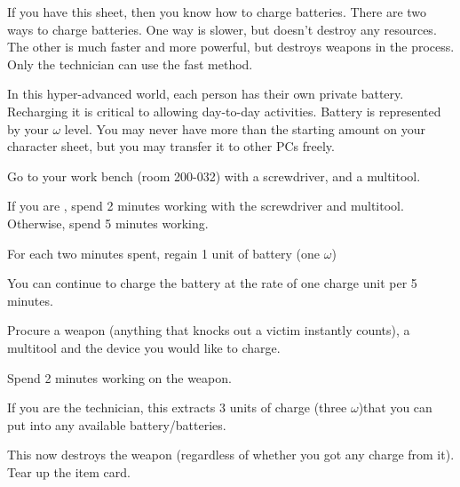 \documentclass[green]{guildcamp3}
\begin{document}
\name{\gBatterycharge{}}



If you have this sheet, then you know how to charge batteries. There are two ways to charge batteries. One way is slower, but doesn't destroy any resources. The other is much faster and more powerful, but destroys weapons in the process. Only the technician can use the fast method. 

In this hyper-advanced world, each person has their own private battery. Recharging it is critical to allowing day-to-day activities. Battery is represented by your $\omega$ level. You may never have more than the starting amount on your character sheet, but you may transfer it to other PCs freely.


\begin{enum}
  \item Go to your work bench (room 200-032) with a screwdriver, and a multitool.
  \item If you are \cTech{}, spend 2 minutes working with the screwdriver and multitool. Otherwise, spend 5 minutes working.
  \item For each two minutes spent, regain 1 unit of battery (one $\omega$)
  \item You can continue to charge the battery at the rate of one charge unit per 5 minutes. 
\end{enum}

\begin{enum}
	\item Procure a weapon (anything that knocks out a victim instantly counts), a multitool and the device you would like to charge.
	\item Spend 2 minutes working on the weapon. 
	\item If you are the technician, this extracts 3 units of charge (three $\omega$)that you can put into any available battery/batteries. 
	\item This now destroys the weapon (regardless of whether you got any charge from it). Tear up the item card. 
\end{enum}
\end{document}
